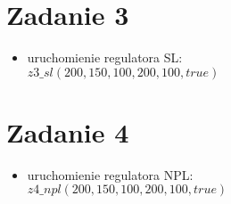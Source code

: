 	\section{Zadanie 3}
	\begin{itemize}
		\item uruchomienie regulatora SL:\\
		$z3\_sl(200, 150, 100, 200, 100, true)$
	\end{itemize}
	
	\section{Zadanie 4}
	\begin{itemize}
		\item uruchomienie regulatora NPL:\\
		$z4\_npl(200, 150, 100, 200, 100, true)$
	\end{itemize}